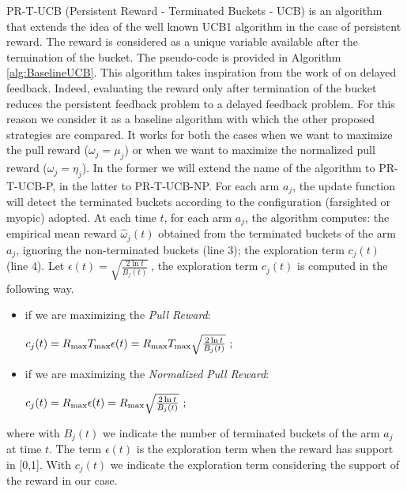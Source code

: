 PR-T-UCB (Persistent Reward - Terminated Buckets - UCB) is an algorithm that extends the idea of the well known UCB1 algorithm in the case of persistent reward. The reward is considered as a unique variable available after the termination of the bucket. The pseudo-code is provided in Algorithm \ref{alg:BaselineUCB}.
This algorithm takes inspiration from the work of \cite{joulani2013} on delayed feedback. Indeed, evaluating the reward only after termination of the bucket reduces the persistent feedback problem to a delayed feedback problem. For this reason we consider it as a baseline algorithm with which the other proposed strategies are compared. It works for both the cases when we want to maximize the pull reward ($\omega_j = \mu_j$) or when we want to maximize the normalized pull reward ($\omega_j = \eta_j$). In the former we will extend the name of the algorithm to PR-T-UCB-P, in the latter to PR-T-UCB-NP.
For each arm $a_j$, the update function will detect the terminated buckets according to the configuration (farsighted or myopic) adopted. At each time $t$, for each arm $a_j$, the algorithm computes: the empirical mean reward $\hat{\omega}_j(t)$ obtained from the terminated buckets of the arm $a_j$, ignoring the non-terminated buckets (line 3); the exploration term $c_j(t)$ (line 4). Let $\epsilon(t) = \sqrt{\frac{2\ln t}{B_j(t)}} \ $, the exploration term  $c_j(t)$ is computed in the following way.
\begin{itemize}
	\item if we are maximizing the \emph{Pull Reward}:\\
	\begin{centering}
		$c_j(t) = R_{\textnormal{max}}  T_{\textnormal{max}} \epsilon(t) = R_{\textnormal{max}}  T_{\textnormal{max}} \sqrt{\frac{2\ln t}{B_j(t)}} \ ;$	
	\end{centering}
		 
	\item if we are maximizing the \emph{Normalized Pull Reward}:\\
	\begin{centering}
			$c_j(t) =R_{\textnormal{max}}  \epsilon(t) = R_{\textnormal{max}}  \sqrt{\frac{2\ln t}{B_j(t)}} \ ;$
	\end{centering}	
\end{itemize}


 where with ${B_j(t)}$ we indicate the number of terminated buckets of the arm $a_j$ at time $t$. The term $\epsilon(t)$ is the exploration term when the reward has support in [0,1]. With $c_j(t)$ we indicate the exploration term considering the support of the reward in our case.
 

